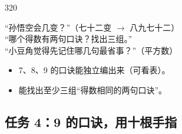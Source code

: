 \begin{lesson}{3}{20}
\begin{saybox}
“孙悟空会几变？”（七十二变 $\to$ 八九七十二）\\
“哪个得数有两句口诀？找出三组。”\\
“小豆角觉得先记住哪几句最省事？”（平方数）
\end{saybox}

\begin{passbox}
\begin{itemize}
  \item 7、8、9 的口诀能独立编出来（可看表）。
  \item 能找出至少三组“得数相同的两句口诀”。
\end{itemize}
\end{passbox}
\end{lesson}

\subsection{任务 4：9 的口诀，用十根手指}

